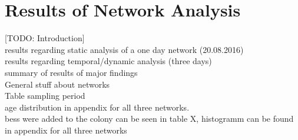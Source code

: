 \chapter{Results of Network Analysis}
\label{ch:results}

[TODO: Introduction]\\
results regarding static analysis of a one day network (20.08.2016)\\
results regarding temporal/dynamic analysis (three days)\\
summary of results of major findings\\

General stuff about networks\\
Table sampling period\\

age distribution in appendix for all three networks.\\
bess were added to the colony can be seen in table X, histogramm can be found in appendix for all three networks\\



\clearpage

